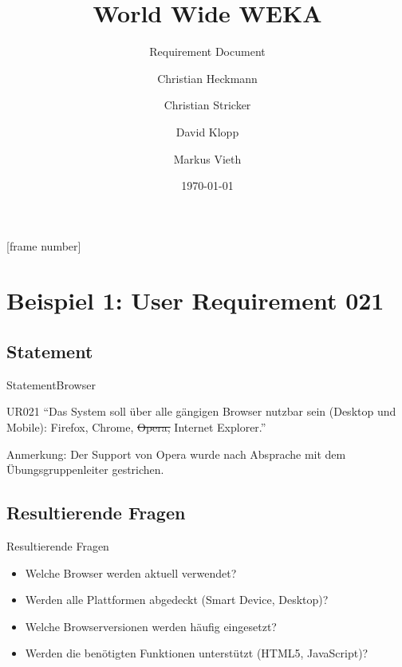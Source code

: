 \documentclass{beamer}
\title[WWWEKA]{World Wide WEKA}
\subtitle{Requirement Document}
\author[C. Heckmann\and C. Stricker\and D. Klopp\and M. Vieth]{Christian Heckmann\and Christian Stricker\and David Klopp\and Markus Vieth}
\date[\today]{\today}
\begin{document}
	
	\frame{
		\titlepage
	}
	[frame number]
	
	
	\section[UR021]{Beispiel 1: User Requirement 021}
	\subsection[Statement]{Statement}
	\begin{frame}{Statement}{Browser}
		\begin{block}{UR021}
			"`Das System soll über alle gängigen Browser nutzbar sein (Desktop und Mobile): Firefox, Chrome, \sout{Opera,} Internet Explorer."'
		\end{block}
		\begin{alertblock}{Anmerkung:}
			Der Support von Opera wurde nach Absprache mit dem Übungsgruppenleiter gestrichen.
		\end{alertblock}
	\end{frame}
	
	\subsection[Resultierende Fragen]{Resultierende Fragen}
	\begin{frame}[<+->][t]{Resultierende Fragen}
		\begin{itemize}		
			\item Welche Browser werden aktuell verwendet?
			\item Werden alle Plattformen abgedeckt (Smart Device, Desktop)?
			\item Welche Browserversionen werden häufig eingesetzt?
			\item Werden die benötigten Funktionen unterstützt (HTML5, JavaScript)?
		\end{itemize}
	\end{frame}
	
\end{document}
